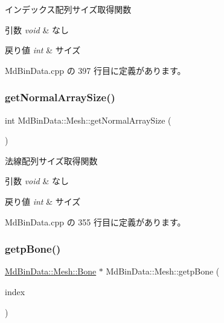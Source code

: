 インデックス配列サイズ取得関数 


\begin{DoxyParams}{引数}
{\em void} & なし \\
\hline
\end{DoxyParams}

\begin{DoxyRetVals}{戻り値}
{\em int} & サイズ \\
\hline
\end{DoxyRetVals}


 Md\+Bin\+Data.\+cpp の 397 行目に定義があります。

\mbox{\label{class_md_bin_data_1_1_mesh_a66050a951548d1da65e986bed4bb4a75}} 
\subsubsection{\texorpdfstring{get\+Normal\+Array\+Size()}{getNormalArraySize()}}
{\footnotesize\ttfamily int Md\+Bin\+Data\+::\+Mesh\+::get\+Normal\+Array\+Size (\begin{DoxyParamCaption}{ }\end{DoxyParamCaption})}



法線配列サイズ取得関数 


\begin{DoxyParams}{引数}
{\em void} & なし \\
\hline
\end{DoxyParams}

\begin{DoxyRetVals}{戻り値}
{\em int} & サイズ \\
\hline
\end{DoxyRetVals}


 Md\+Bin\+Data.\+cpp の 355 行目に定義があります。

\mbox{\label{class_md_bin_data_1_1_mesh_a399b02c6aec7bdcf7eae52e846797c90}} 
\subsubsection{\texorpdfstring{getp\+Bone()}{getpBone()}}
{\footnotesize\ttfamily \mbox{\hyperlink{class_md_bin_data_1_1_mesh_1_1_bone}{Md\+Bin\+Data\+::\+Mesh\+::\+Bone}} $\ast$ Md\+Bin\+Data\+::\+Mesh\+::getp\+Bone (\begin{DoxyParamCaption}\item[{int}]{index }\end{DoxyParamCaption})}



